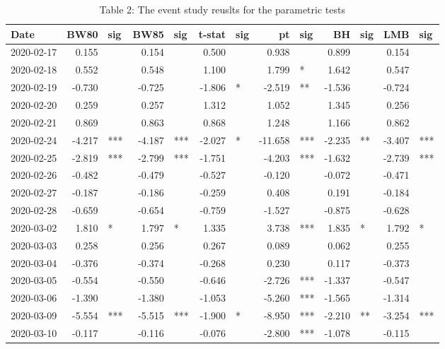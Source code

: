 \documentclass[
]{article}
\begin{document}
\begin{table}

\caption{\label{tab:unnamed-chunk-3}Table 2: The event study reuslts for the parametric tests}
\centering
\begin{tabular}[t]{l|r|l|r|l|r|l|r|l|r|l|r|l}
\hline
Date & BW80 & sig & BW85 & sig & t-stat & sig & pt & sig & BH & sig & LMB & sig\\
\hline
2020-02-17 & 0.155 &  & 0.154 &  & 0.500 &  & 0.938 &  & 0.899 &  & 0.154 & \\
\hline
2020-02-18 & 0.552 &  & 0.548 &  & 1.100 &  & 1.799 & * & 1.642 &  & 0.547 & \\
\hline
2020-02-19 & -0.730 &  & -0.725 &  & -1.806 & * & -2.519 & ** & -1.536 &  & -0.724 & \\
\hline
2020-02-20 & 0.259 &  & 0.257 &  & 1.312 &  & 1.052 &  & 1.345 &  & 0.256 & \\
\hline
2020-02-21 & 0.869 &  & 0.863 &  & 0.868 &  & 1.248 &  & 1.166 &  & 0.862 & \\
\hline
2020-02-24 & -4.217 & *** & -4.187 & *** & -2.027 & * & -11.658 & *** & -2.235 & ** & -3.407 & ***\\
\hline
2020-02-25 & -2.819 & *** & -2.799 & *** & -1.751 &  & -4.203 & *** & -1.632 &  & -2.739 & ***\\
\hline
2020-02-26 & -0.482 &  & -0.479 &  & -0.527 &  & -0.120 &  & -0.072 &  & -0.471 & \\
\hline
2020-02-27 & -0.187 &  & -0.186 &  & -0.259 &  & 0.408 &  & 0.191 &  & -0.184 & \\
\hline
2020-02-28 & -0.659 &  & -0.654 &  & -0.759 &  & -1.527 &  & -0.875 &  & -0.628 & \\
\hline
2020-03-02 & 1.810 & * & 1.797 & * & 1.335 &  & 3.738 & *** & 1.835 & * & 1.792 & *\\
\hline
2020-03-03 & 0.258 &  & 0.256 &  & 0.267 &  & 0.089 &  & 0.062 &  & 0.255 & \\
\hline
2020-03-04 & -0.376 &  & -0.374 &  & -0.268 &  & 0.230 &  & 0.117 &  & -0.373 & \\
\hline
2020-03-05 & -0.554 &  & -0.550 &  & -0.646 &  & -2.726 & *** & -1.337 &  & -0.547 & \\
\hline
2020-03-06 & -1.390 &  & -1.380 &  & -1.053 &  & -5.260 & *** & -1.565 &  & -1.314 & \\
\hline
2020-03-09 & -5.554 & *** & -5.515 & *** & -1.900 & * & -8.950 & *** & -2.210 & ** & -3.254 & ***\\
\hline
2020-03-10 & -0.117 &  & -0.116 &  & -0.076 &  & -2.800 & *** & -1.078 &  & -0.115 & \\

\end{tabular}
\end{table}
\end{document}
